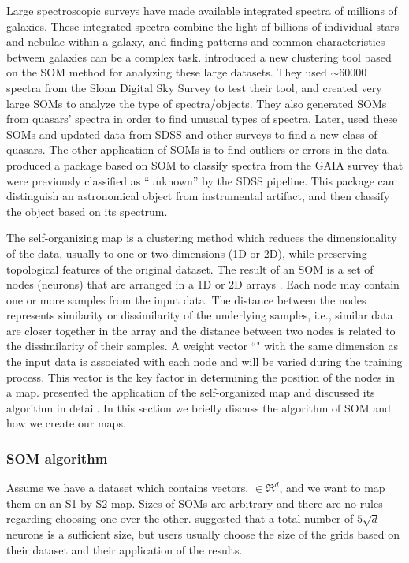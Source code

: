 Large spectroscopic surveys have made available integrated spectra of millions of galaxies.
These integrated spectra combine the light of billions of individual stars and nebulae within a galaxy, and
finding patterns and common characteristics between galaxies can be a complex task.
\citet{In12} introduced a new clustering tool based on the SOM method for analyzing these large datasets.
They used $\sim 60000$ spectra from the Sloan Digital Sky Survey \citep[SDSS;][]{Abazajian09} to test their tool, and created very large SOMs to analyze the type of spectra/objects.
They also generated SOMs from quasars' spectra in order to find unusual types of spectra. 
Later, \citet{Meusinger16} used these SOMs and updated data from SDSS and other surveys to find a new class of quasars.
The other application of SOMs is to find outliers or errors in the data.
\citet{Fustes13} produced a package based on SOM to classify spectra from the GAIA survey that were previously classified as ``unknown'' by the SDSS pipeline. This package can distinguish an astronomical object from instrumental artifact, and then classify the object based on its spectrum.


 
 The self-organizing map is a clustering method which reduces the dimensionality of the data, usually to one or two dimensions (1D or 2D), while preserving topological features of the original dataset.
 The result of an SOM is a set of nodes (neurons) that are arranged in a 1D or 2D arrays \citep{Kohonen98}. 
 Each node may contain one or more samples from the input data.
 The distance between the nodes represents similarity or dissimilarity of the underlying samples, i.e., similar data are closer together in the array and the distance between two nodes is related to the dissimilarity of their samples.
 A weight vector ``" with the same dimension as the input data is associated with each node and will be varied during the training process.
 This vector is the key factor in determining the position of the nodes in a map.
 \cite{Geach12} presented the application of the self-organized map and discussed its algorithm in detail.
 In this section we briefly discuss the algorithm of SOM and how we create our maps. 
 
 \subsubsection{SOM algorithm} 
 \label{sec: algorithm}
     Assume we have a dataset which contains vectors,  $\in \Re^d$, and we want to map them on an S1 by S2 map. 
     Sizes of SOMs are arbitrary and there are no rules regarding choosing one over the other. 
    \citet{Vesanto05} suggested that a total number of $5\sqrt{d}$ neurons is a sufficient size, but users usually choose the size of the grids based on their dataset and their application of the results.


